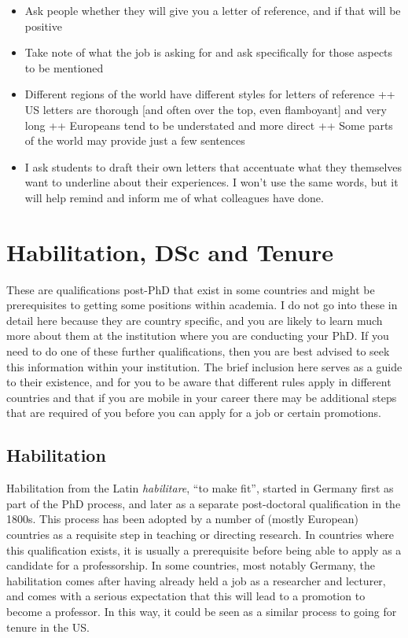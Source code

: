 \documentclass[
]{krantz}
\providecommand{\tightlist}{%
  \setlength{\itemsep}{0pt}\setlength{\parskip}{0pt}}
\begin{document}
\begin{itemize}
  \begin{itemize}
  \tightlist
  \item
    Ask people whether they will give you a letter of reference, and if that will be positive
  \item
    Take note of what the job is asking for and ask specifically for those aspects to be mentioned
  \item
    Different regions of the world have different styles for letters of reference
    ++ US letters are thorough {[}and often over the top, even flamboyant{]} and very long
    ++ Europeans tend to be understated and more direct
    ++ Some parts of the world may provide just a few sentences
  \item
    I ask students to draft their own letters that accentuate what they themselves want to underline about their experiences. I won't use the same words, but it will help remind and inform me of what colleagues have done.
  \end{itemize}
\end{itemize}

\hypertarget{habilitation}{%
\chapter{Habilitation, DSc and Tenure}\label{habilitation}}

These are qualifications post-PhD that exist in some countries and might be prerequisites to getting some positions within academia. I do not go into these in detail here because they are country specific, and you are likely to learn much more about them at the institution where you are conducting your PhD. If you need to do one of these further qualifications, then you are best advised to seek this information within your institution. The brief inclusion here serves as a guide to their existence, and for you to be aware that different rules apply in different countries and that if you are mobile in your career there may be additional steps that are required of you before you can apply for a job or certain promotions.

\hypertarget{habilitation-1}{%
\section{Habilitation}\label{habilitation-1}}

Habilitation from the Latin \emph{habilitare}, ``to make fit'', started in Germany first as part of the PhD process, and later as a separate post-doctoral qualification in the 1800s. This process has been adopted by a number of (mostly European) countries as a requisite step in teaching or directing research. In countries where this qualification exists, it is usually a prerequisite before being able to apply as a candidate for a professorship. In some countries, most notably Germany, the habilitation comes after having already held a job as a researcher and lecturer, and comes with a serious expectation that this will lead to a promotion to become a professor. In this way, it could be seen as a similar process to going for tenure in the US.
\end{document}
